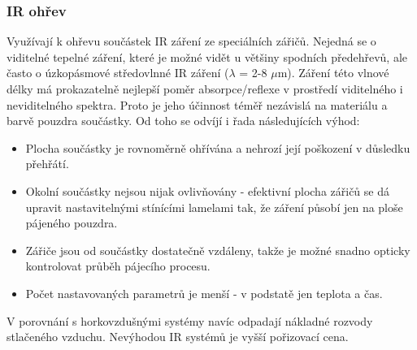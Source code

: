 \subsubsection{IR ohřev}
Využívají k ohřevu součástek IR záření ze speciálních zářičů.
Nejedná se o viditelné tepelné záření, které je možné vidět u většiny spodních předehřevů, ale často o úzkopásmové středovlnné IR záření ($\lambda$ = 2-8 $\mu$m). Záření této vlnové délky má prokazatelně nejlepší poměr absorpce/reflexe v prostředí viditelného i neviditelného spektra. Proto je jeho účinnost téměř nezávislá na materiálu a barvě pouzdra součástky. Od toho se
odvíjí i řada následujících výhod:
\begin{itemize}
\item Plocha součástky je rovnoměrně ohřívána a nehrozí její poškození
v důsledku přehřátí.
\item Okolní součástky nejsou nijak ovlivňovány - efektivní plocha zářičů se dá upravit
nastavitelnými stínícími lamelami tak, že záření působí jen na ploše pájeného pouzdra.
\item Zářiče jsou od součástky dostatečně vzdáleny, takže je možné snadno opticky
kontrolovat průběh pájecího procesu.
\item Počet nastavovaných parametrů je menší - v podstatě jen teplota a čas.
\end{itemize}
V porovnání s horkovzdušnými systémy navíc odpadají nákladné rozvody stlačeného
vzduchu. Nevýhodou IR systémů je vyšší pořizovací cena.


